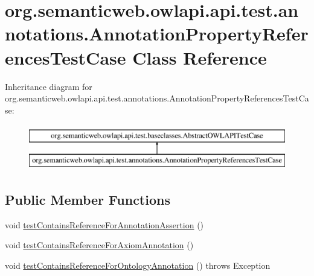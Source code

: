 \hypertarget{classorg_1_1semanticweb_1_1owlapi_1_1api_1_1test_1_1annotations_1_1_annotation_property_references_test_case}{\section{org.\-semanticweb.\-owlapi.\-api.\-test.\-annotations.\-Annotation\-Property\-References\-Test\-Case Class Reference}
\label{classorg_1_1semanticweb_1_1owlapi_1_1api_1_1test_1_1annotations_1_1_annotation_property_references_test_case}
}
Inheritance diagram for org.\-semanticweb.\-owlapi.\-api.\-test.\-annotations.\-Annotation\-Property\-References\-Test\-Case\-:\begin{figure}[H]
\begin{center}
\leavevmode
\includegraphics[height=2.000000cm]{classorg_1_1semanticweb_1_1owlapi_1_1api_1_1test_1_1annotations_1_1_annotation_property_references_test_case}
\end{center}
\end{figure}
\subsection*{Public Member Functions}
\begin{DoxyCompactItemize}
\item 
void \hyperlink{classorg_1_1semanticweb_1_1owlapi_1_1api_1_1test_1_1annotations_1_1_annotation_property_references_test_case_a634dc2e3c71ffd6e1d6f4bcaaf2671e1}{test\-Contains\-Reference\-For\-Annotation\-Assertion} ()
\item 
void \hyperlink{classorg_1_1semanticweb_1_1owlapi_1_1api_1_1test_1_1annotations_1_1_annotation_property_references_test_case_acf51466efceb3e675a283853dc3cf5fe}{test\-Contains\-Reference\-For\-Axiom\-Annotation} ()
\item 
void \hyperlink{classorg_1_1semanticweb_1_1owlapi_1_1api_1_1test_1_1annotations_1_1_annotation_property_references_test_case_aaa31ed59eedf67fa8b346e49b5d4f283}{test\-Contains\-Reference\-For\-Ontology\-Annotation} ()  throws Exception 
\end{DoxyCompactItemize}
